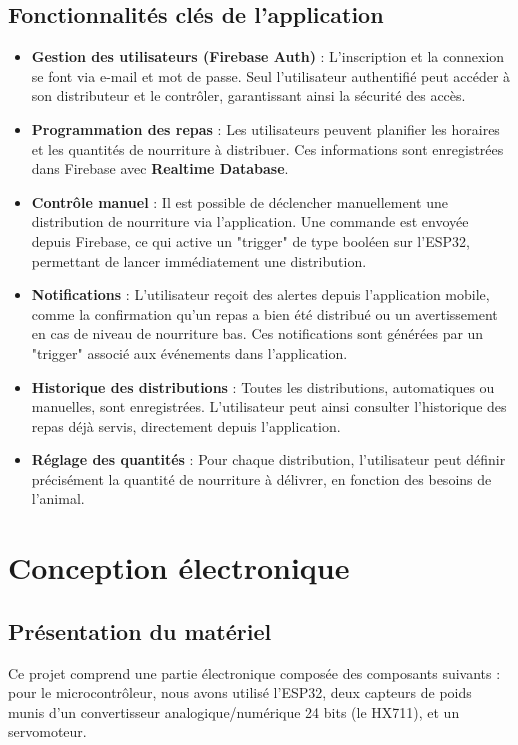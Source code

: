 \section{Fonctionnalités clés de l’application} 
\begin{itemize}
	\item \textbf{Gestion des utilisateurs (Firebase Auth)} : 
	L'inscription et la connexion se font via e-mail et mot de passe. Seul l’utilisateur authentifié peut accéder à son distributeur et le contrôler, garantissant ainsi la sécurité des accès.

	\item \textbf{Programmation des repas} :
	Les utilisateurs peuvent planifier les horaires et les quantités de nourriture à distribuer. Ces informations sont enregistrées dans Firebase avec \textbf{Realtime Database}.

	\item \textbf{Contrôle manuel} :
	Il est possible de déclencher manuellement une distribution de nourriture via l’application. Une commande est envoyée depuis Firebase, ce qui active un "trigger" de type booléen sur l’ESP32, permettant de lancer immédiatement une distribution.

	\item \textbf{Notifications} :
	L’utilisateur reçoit des alertes depuis l’application mobile, comme la confirmation qu’un repas a bien été distribué ou un avertissement en cas de niveau de nourriture bas. Ces notifications sont générées par un "trigger" associé aux événements dans l’application.

	\item \textbf{Historique des distributions} :
	Toutes les distributions, automatiques ou manuelles, sont enregistrées. L’utilisateur peut ainsi consulter l’historique des repas déjà servis, directement depuis l’application.

	\item \textbf{Réglage des quantités} :
	Pour chaque distribution, l’utilisateur peut définir précisément la quantité de nourriture à délivrer, en fonction des besoins de l’animal.
\end{itemize}


\pagestyle{fancy}
\fancyhead{} %
\chapter{Conception électronique}
\section{Présentation du matériel}
Ce projet comprend une partie électronique composée des composants suivants : pour le microcontrôleur, nous avons utilisé l'ESP32, deux capteurs de poids munis d’un convertisseur analogique/numérique 24 bits (le HX711), et un servomoteur.

